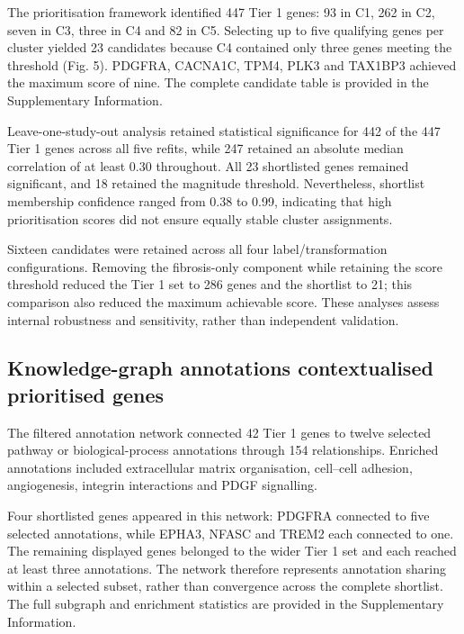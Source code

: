 The prioritisation framework identified 447 Tier 1 genes: 93 in C1, 262 in C2, seven in C3, three in C4 and 82 in C5. Selecting up to five qualifying genes per cluster yielded 23 candidates because C4 contained only three genes meeting the threshold (Fig. 5). PDGFRA, CACNA1C, TPM4, PLK3 and TAX1BP3 achieved the maximum score of nine. The complete candidate table is provided in the Supplementary Information.

Leave-one-study-out analysis retained statistical significance for 442 of the 447 Tier 1 genes across all five refits, while 247 retained an absolute median correlation of at least 0.30 throughout. All 23 shortlisted genes remained significant, and 18 retained the magnitude threshold. Nevertheless, shortlist membership confidence ranged from 0.38 to 0.99, indicating that high prioritisation scores did not ensure equally stable cluster assignments.

Sixteen candidates were retained across all four label/transformation configurations. Removing the fibrosis-only component while retaining the score threshold reduced the Tier 1 set to 286 genes and the shortlist to 21; this comparison also reduced the maximum achievable score. These analyses assess internal robustness and sensitivity, rather than independent validation.

\subsection*{Knowledge-graph annotations contextualised prioritised genes}

The filtered annotation network connected 42 Tier 1 genes to twelve selected pathway or biological-process annotations through 154 relationships. Enriched annotations included extracellular matrix organisation, cell–cell adhesion, angiogenesis, integrin interactions and PDGF signalling.

Four shortlisted genes appeared in this network: PDGFRA connected to five selected annotations, while EPHA3, NFASC and TREM2 each connected to one. The remaining displayed genes belonged to the wider Tier 1 set and each reached at least three annotations. The network therefore represents annotation sharing within a selected subset, rather than convergence across the complete shortlist. The full subgraph and enrichment statistics are provided in the Supplementary Information.
